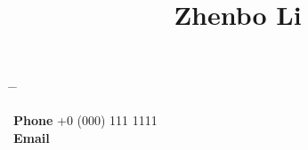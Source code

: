 

\title{Zhenbo Li} %

\parbox[c][3em][t]{0.9\textwidth}{ %
	\begin{tabbing} %
		\hspace{3cm} \= \hspace{4cm} \= \kill %
		
{\bf Phone} \> +0 (000) 111 1111 \\ %
{\bf Email} \> 
		
	\end{tabbing}
}

